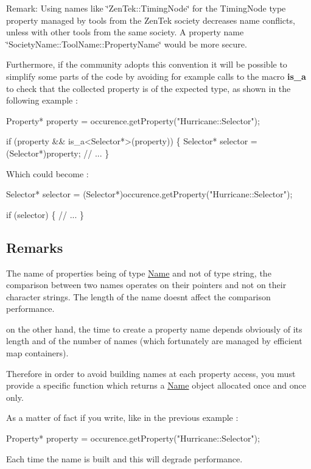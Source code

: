 \begin{DoxyParagraph}{Remark\+:}
Using names like \char`\"{}\+Zen\+Tek\+::\+Timing\+Node\char`\"{} for the Timing\+Node type property managed by tools from the Zen\+Tek society decreases name conflicts, unless with other tools from the same society. A property name \char`\"{}\+Society\+Name\+::\+Tool\+Name\+::\+Property\+Name\char`\"{} would be more secure.
\end{DoxyParagraph}
Furthermore, if the community adopts this convention it will be possible to simplify some parts of the code by avoiding for example calls to the macro {\bfseries is\+\_\+a} to check that the collected property is of the expected type, as shown in the following example \+: 
\begin{DoxyCode}
Property* \textcolor{keyword}{property} = occurence.getProperty(\textcolor{stringliteral}{"Hurricane::Selector"});
 
\textcolor{keywordflow}{if} (property && is\_a<Selector*>(property)) \{
  Selector* selector = (Selector*)property;
  \textcolor{comment}{// ...}
\}
\end{DoxyCode}
 Which could become \+: 
\begin{DoxyCode}
Selector* selector = (Selector*)occurence.getProperty(\textcolor{stringliteral}{"Hurricane::Selector"});
 
\textcolor{keywordflow}{if} (selector) \{
  \textcolor{comment}{// ...}
\}
\end{DoxyCode}
\hypertarget{classHurricane_1_1Property_secPropertyRemarks}{}\subsection{Remarks}\label{classHurricane_1_1Property_secPropertyRemarks}
The name of properties being of type \hyperlink{classHurricane_1_1Name}{Name} and not of type string, the comparison between two names operates on their pointers and not on their character strings. The length of the name doesn\textquotesingle{}t affect the comparison performance.

on the other hand, the time to create a property name depends obviously of its length and of the number of names (which fortunately are managed by efficient map containers).

Therefore in order to avoid building names at each property access, you must provide a specific function which returns a \hyperlink{classHurricane_1_1Name}{Name} object allocated once and once only.

As a matter of fact if you write, like in the previous example \+: 
\begin{DoxyCode}
Property* \textcolor{keyword}{property} = occurence.getProperty(\textcolor{stringliteral}{"Hurricane::Selector"});
\end{DoxyCode}
 Each time the name is built and this will degrade performance.

